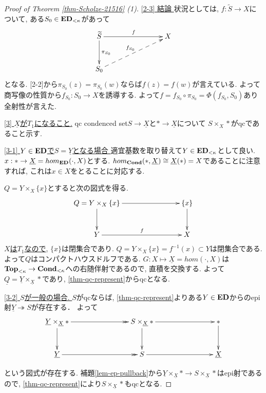 \documentclass[dvipdfmx,a4paper,11pt]{article}
\theoremstyle{definition}
\begin{document}
\begin{proof}[Proof of Theorem \ref{thm-Scholze-21516} (1)]
\underline{[2-3] 結論 }
状況としては, $f : \widetilde{S} \to X$について, ある$S_0 \in {\bf ED}_{< \kappa}$があって
\begin{equation*}
\xymatrix@C=80pt@R=30pt{
\widetilde{S} \ar@{->}[r]^{f}
\ar@{->}[d]^{\pi_{S_0}}
&X 
\\
S_0\ar@{-->}[ru]^{f_{S_0}}
&
 \\   
}
\end{equation*}
となる. [2-2]から$\pi_{S_0}(z) = \pi_{S_0}(w)$ならば$f(z)=f(w)$が言えている. 
よって商写像の性質から$f_{S_0} : S_0 \to X$を誘導する. 
よって$f = f_{S_0} \circ \pi_{S_0} = \Phi(f_{S_0}, S_0)$あり全射性が言えた. 

\underline{[3] $\underline{X}$が$T_1$になること.}
qc condenced set$S \to \underline{X}$と$\ast \to \underline{X}$について
$S\times_{X} \ast$がqcであること示す. 

\underline{[3-1] $Y \in {\bf ED}$で$S =\underline{Y}$となる場合 }
適宜基数を取り替えて$Y \in {\bf ED}_{<\kappa}$として良い. 
$x : \ast \to \underline{X}=hom_{{\bf ED}}(\cdot, X)$とする.  
$hom_{{\bf Cond}}(\ast, \underline{X}) \cong \underline{X}(\ast) =X$であることに注意すれば, これは$x \in X$をとることに対応する. 

$Q= Y \times_{X} \{ x\}$とすると次の図式を得る. 
\begin{equation*}
\xymatrix@C=80pt@R=30pt{
Q= Y \times_{X} \{ x\} \ar@{->}[r]
\ar@{->}[d]
& \{ x\}\ar@{->}[d]
\\
Y\ar@{->}[r]^{f}
&X
 \\   
}
\end{equation*}
\underline{$X$は$T_1$なので}, $\{ x\}$は閉集合であり. 
$Q = Y \times_{X} \{ x\}=f^{-1}(x) \subset Y$は閉集合である.
よって$Q$はコンパクトハウスドルフである. 
$G : X \mapsto \underline{X} = hom(\cdot, X)$は${\bf Top}_{< \kappa} \to {\bf Cond}_{< \kappa}$への右随伴射であるので, 直積を交換する.
よって
$\underline{Q} = \underline{Y} \times_{\underline{X}} \ast$であり, \ref{thm-qc-represent}からqcとなる. 

\underline{[3-2] $S$が一般の場合. }
$S$がqcならば, \ref{thm-qc-represent}よりある$Y \in {\bf ED}$からのepi射$\underline{Y} \twoheadrightarrow S$が存在する．
よって
\begin{equation*}
\xymatrix@C=80pt@R=30pt{
\underline{Y} \times_{\underline{X}} \ast
\ar@{->}[d]\ar@{->>}[r]
&S\times_{\underline{X}} \ast \ar@{->}[d]\ar@{->}[r]
&\ast \ar@{->}[d]
\\
\underline{Y}\ar@{->>}[r]
&S\ar@{->}[r]
&\underline{X}
 \\   
}
\end{equation*}

という図式が存在する. 
補題\ref{lem-ep-pullback}から$\underline{Y} \times_{\underline{X}}\ast \to S\times_{\underline{X}} \ast $はepi射であるので, \ref{thm-qc-represent}により$S\times_{\underline{X}} \ast $もqcとなる.
\end{proof}
\end{document}
